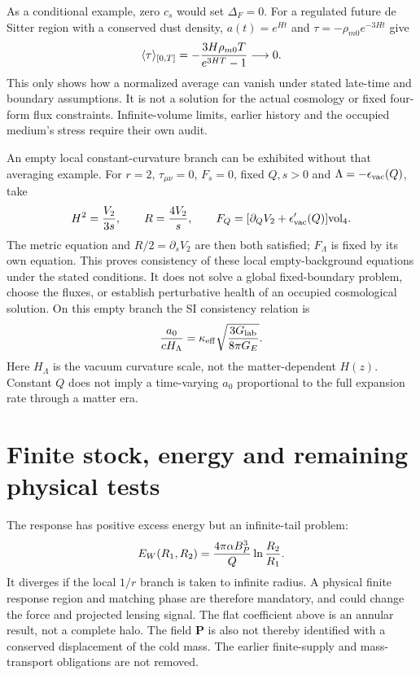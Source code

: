 \documentclass[11pt]{article}
\begin{document}
As a conditional example, zero $c_s$ would set $\Delta_F=0$.
For a regulated future de Sitter region with a conserved dust density,
$a(t)=e^{Ht}$ and $\tau=-\rho_{m0}e^{-3Ht}$ give
\begin{equation}
 \langle\tau\rangle_{[0,T]}
       =-{3H\rho_{m0}T\over e^{3HT}-1}\longrightarrow0.
\end{equation}
This only shows how a normalized average can vanish under stated late-time
and boundary assumptions. It is not a solution for the actual cosmology
or fixed four-form flux constraints. Infinite-volume limits, earlier
history and the occupied medium's stress require their own audit.

An empty local constant-curvature branch can be exhibited without that
averaging example. For $r=2$, $\tau_{\mu\nu}=0$, $F_s=0$, fixed
$Q,s>0$ and $\Lambda=-\epsilon_{\rm vac}(Q)$, take
\begin{equation}
 H^2={V_2\over3s},\qquad R={4V_2\over s},\qquad
 F_Q=[\partial_QV_2+\epsilon_{\rm vac}'(Q)]\mathrm{vol}_4.
\end{equation}
The metric equation and $R/2=\partial_sV_2$ are then both satisfied;
$F_\Lambda$ is fixed by its own equation. This proves consistency of
these local empty-background equations under the stated conditions. It
does not solve a global fixed-boundary problem, choose the fluxes, or
establish perturbative health of an occupied cosmological solution.
On this empty branch the SI consistency relation is
\begin{equation}
 {a_0\over cH_\Lambda}
   =\kappa_{\rm eff}\sqrt{{3G_{\rm lab}\over8\pi G_E}}.
\end{equation}
Here $H_\Lambda$ is the vacuum curvature scale, not the matter-dependent
$H(z)$. Constant $Q$ does not imply a time-varying $a_0$ proportional to
the full expansion rate through a matter era.

\section{Finite stock, energy and remaining physical tests}
The response has positive excess energy but an infinite-tail problem:
\begin{equation}
 E_W(R_1,R_2)={4\pi\alpha B_P^3\over Q}
                         \ln{R_2\over R_1}.
\end{equation}
It diverges if the local $1/r$ branch is taken to infinite radius.
A physical finite response region and matching phase are therefore
mandatory, and could change the force and projected lensing signal.
The flat coefficient above is an annular result, not a complete halo.
The field $\mathbf P$ is also not thereby identified with a conserved
displacement of the cold mass. The earlier finite-supply and mass-transport
obligations are not removed.
\end{document}

